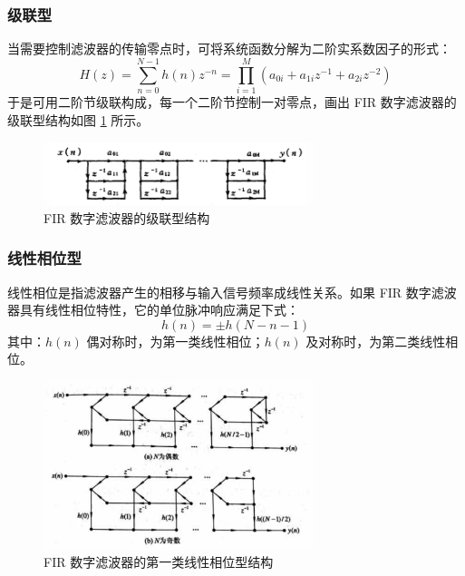 \documentclass[12pt,AutoFakeBold]{article}
\begin{document}
\subsubsection{级联型}

当需要控制滤波器的传输零点时，可将系统函数分解为二阶实系数因子的形式：
%
\begin{equation}
H(z)= \sum_{n=0}^{N-1}h(n)z^{-n} =\prod_{i=1}^{M} \left(a_{0i}+a_{1i}z^{-1}+a_{2i}z^{-2}\right)
\end{equation}
%
于是可用二阶节级联构成，每一个二阶节控制一对零点，画出 FIR 数字滤波器的级联型结构如图 \ref{fig:cascade} 所示。

\begin{figure}[hbtp]
	\centering
	\includegraphics[width=0.7\textwidth]{figure/cascade.png}
	\caption{FIR 数字滤波器的级联型结构} \label{fig:cascade}
\end{figure}

\subsubsection{线性相位型}

线性相位是指滤波器产生的相移与输入信号频率成线性关系。如果 FIR 数字滤波器具有线性相位特性，它的单位脉冲响应满足下式：
%
\begin{equation}
h(n)=\pm h(N-n-1)
\end{equation}
%
其中：$h(n)$ 偶对称时，为第一类线性相位；$h(n)$ 及对称时，为第二类线性相位。

\begin{figure}[hbtp]
	\centering
	\includegraphics[width=0.7\textwidth]{figure/linear_phase1.png}
	\caption{FIR 数字滤波器的第一类线性相位型结构} \label{fig:linear_phase1}
\end{figure}
\end{document}
